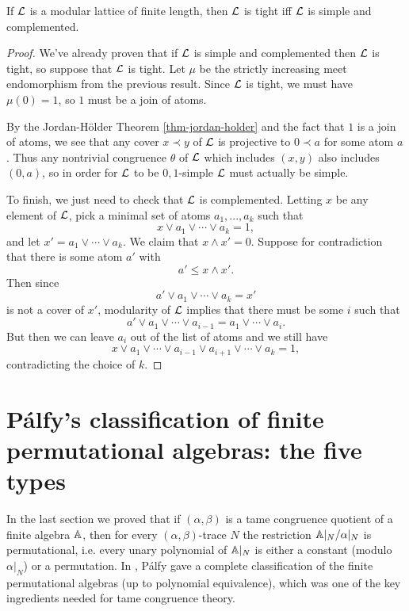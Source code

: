 \begin{appendices}
\begin{prop} If $\mathcal{L}$ is a modular lattice of finite length, then $\mathcal{L}$ is tight iff $\mathcal{L}$ is simple and complemented.
\end{prop}
\begin{proof} We've already proven that if $\mathcal{L}$ is simple and complemented then $\mathcal{L}$ is tight, so suppose that $\mathcal{L}$ is tight. Let $\mu$ be the strictly increasing meet endomorphism from the previous result. Since $\mathcal{L}$ is tight, we must have $\mu(0) = 1$, so $1$ must be a join of atoms.

By the Jordan-H\"older Theorem \ref{thm-jordan-holder} and the fact that $1$ is a join of atoms, we see that any cover $x \prec y$ of $\mathcal{L}$ is projective to $0 \prec a$ for some atom $a$. Thus any nontrivial congruence $\theta$ of $\mathcal{L}$ which includes $(x,y)$ also includes $(0,a)$, so in order for $\mathcal{L}$ to be $0,1$-simple $\mathcal{L}$ must actually be simple.

To finish, we just need to check that $\mathcal{L}$ is complemented. Letting $x$ be any element of $\mathcal{L}$, pick a minimal set of atoms $a_1, ..., a_k$ such that
\[
x \vee a_1 \vee \cdots \vee a_k = 1,
\]
and let $x' = a_1 \vee \cdots \vee a_k$. We claim that $x \wedge x' = 0$. Suppose for contradiction that there is some atom $a'$ with
\[
a' \le x \wedge x'.
\]
Then since
\[
a' \vee a_1 \vee \cdots \vee a_k = x'
\]
is not a cover of $x'$, modularity of $\mathcal{L}$ implies that there must be some $i$ such that
\[
a' \vee a_1 \vee \cdots \vee a_{i-1} = a_1 \vee \cdots \vee a_i.
\]
But then we can leave $a_i$ out of the list of atoms and we still have
\[
x \vee a_1 \vee \cdots \vee a_{i-1} \vee a_{i+1} \vee \cdots \vee a_k = 1,
\]
contradicting the choice of $k$.
\end{proof}


\section{P\'alfy's classification of finite permutational algebras: the five types}

In the last section we proved that if $(\alpha,\beta)$ is a tame congruence quotient of a finite algebra $\mathbb{A}$, then for every $(\alpha,\beta)$-trace $N$ the restriction $\mathbb{A}|_N / \alpha|_N$ is permutational, i.e. every unary polynomial of $\mathbb{A}|_N$ is either a constant (modulo $\alpha|_N$) or a permutation. In \cite{palfy-permutational}, P\'alfy gave a complete classification of the finite permutational algebras (up to polynomial equivalence), which was one of the key ingredients needed for tame congruence theory.


\end{appendices}
